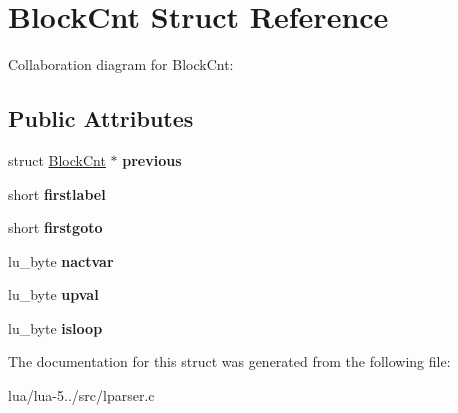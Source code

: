 \hypertarget{struct_block_cnt}{\section{Block\+Cnt Struct Reference}
\label{struct_block_cnt}
}


Collaboration diagram for Block\+Cnt\+:
\subsection*{Public Attributes}
\begin{DoxyCompactItemize}
\item 
\hypertarget{struct_block_cnt_ad8896bfd8de35494fc3b7f1e31eb0032}{struct \hyperlink{struct_block_cnt}{Block\+Cnt} $\ast$ {\bfseries previous}}\label{struct_block_cnt_ad8896bfd8de35494fc3b7f1e31eb0032}

\item 
\hypertarget{struct_block_cnt_a4e604796bc56368aee582bf0fac5bcca}{short {\bfseries firstlabel}}\label{struct_block_cnt_a4e604796bc56368aee582bf0fac5bcca}

\item 
\hypertarget{struct_block_cnt_a570dca92d01a0fe79dab563c1fba4019}{short {\bfseries firstgoto}}\label{struct_block_cnt_a570dca92d01a0fe79dab563c1fba4019}

\item 
\hypertarget{struct_block_cnt_a02cb8afbdb34955d5499d4ee49c34ae8}{lu\+\_\+byte {\bfseries nactvar}}\label{struct_block_cnt_a02cb8afbdb34955d5499d4ee49c34ae8}

\item 
\hypertarget{struct_block_cnt_a42e96c963c3c53887b4c93e9b7a53bac}{lu\+\_\+byte {\bfseries upval}}\label{struct_block_cnt_a42e96c963c3c53887b4c93e9b7a53bac}

\item 
\hypertarget{struct_block_cnt_a6434a0c8f9724248c839b6e9e6d9ec00}{lu\+\_\+byte {\bfseries isloop}}\label{struct_block_cnt_a6434a0c8f9724248c839b6e9e6d9ec00}

\end{DoxyCompactItemize}


The documentation for this struct was generated from the following file\+:\begin{DoxyCompactItemize}
\item 
lua/lua-\/5../src/lparser.\+c\end{DoxyCompactItemize}
